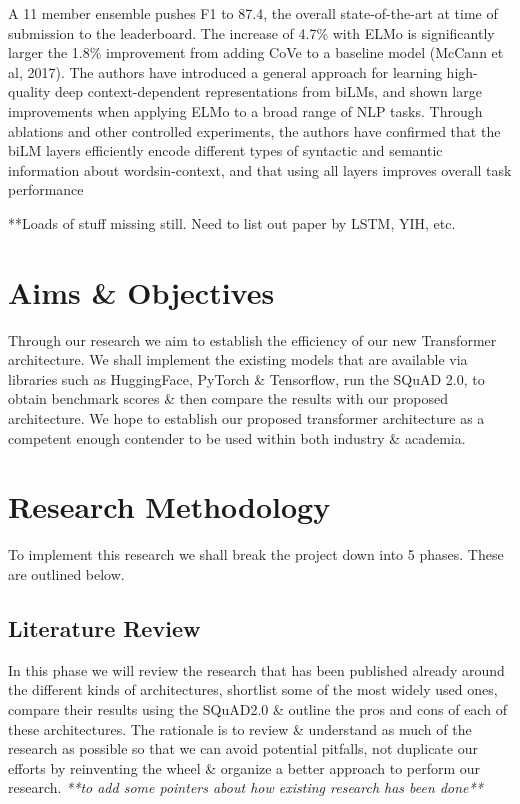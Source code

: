 \documentclass[11pt]{article}
\begin{document}
\begin{enumerate}
    A 11 member ensemble pushes F1 to 87.4, the overall state-of-the-art at time of submission to the leaderboard. The increase of 4.7\% with ELMo is significantly larger the 1.8\% improvement from adding CoVe to a baseline model (McCann et al, 2017).  The authors have introduced a general approach for learning high-quality deep context-dependent representations from biLMs, and shown large improvements when applying ELMo to a broad range of NLP tasks.
    Through ablations and other controlled experiments, the authors have confirmed that the biLM layers efficiently encode different types of syntactic and semantic information about wordsin-context, and that using all layers improves overall task performance
    \cite{contextualized}
\end{enumerate}

**Loads of stuff missing still. Need to list out paper by LSTM, YIH, etc.
\newpage
\newpage
\section{Aims \& Objectives}\label{aims}

Through our research we aim to establish the efficiency of our new Transformer architecture. We shall implement the existing models that are available via libraries such as HuggingFace\cite{hfTransformers}, PyTorch \& Tensorflow, run the SQuAD 2.0\cite{dataset}, to obtain benchmark scores \& then compare the results with our proposed architecture. We hope to establish our proposed transformer architecture as a competent enough contender to be used within both industry \& academia.
\section{Research Methodology}\label{researchMeth}

To implement this research we shall break the project down into 5 phases. These are outlined below.
\subsection{Literature Review}\label{litrev}
In this phase we will review the research that has been published already around the different kinds of architectures, shortlist some of the most widely used ones, compare their results using the SQuAD2.0 \cite{dataset} \& outline the pros and cons of each of these architectures. The rationale is to review \& understand as much of the research as possible so that we can avoid potential pitfalls, not duplicate our efforts by reinventing the wheel \& organize a better approach to perform our research.\textit{ **to add some pointers about how existing research has been done**}
\end{document}
